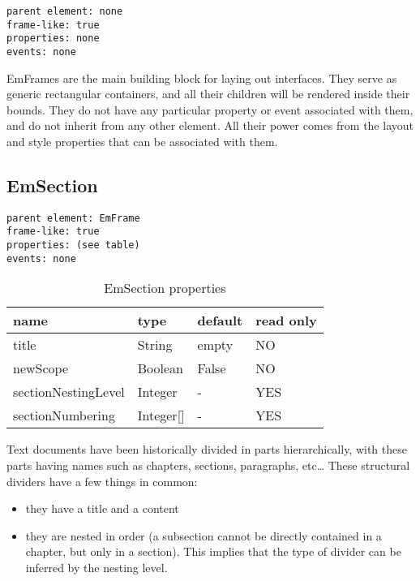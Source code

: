 \begin{verbatim}
parent element: none
frame-like: true
properties: none
events: none
\end{verbatim}

EmFrames are the main building block for laying out interfaces. They serve as generic rectangular containers, and all their children will be rendered inside their bounds. They do not have any particular property or event associated with them, and do not inherit from any other element. All their power comes from the layout and style properties that can be associated with them.

\subsection{EmSection}
\label{sec:emsection}

\begin{verbatim}
parent element: EmFrame
frame-like: true
properties: (see table)
events: none
\end{verbatim}

\begin{table}[ht]
\caption{EmSection properties}
\centering
\begin{tabular}{l l l l}
\hline\hline
name & type & default & read only \\ [0.5ex]
\hline %
title & String & empty & NO \\
newScope & Boolean & False & NO \\
sectionNestingLevel & Integer & - & YES \\
sectionNumbering & Integer[] & - & YES \\ [1ex] %
\hline %
\end{tabular}
\end{table}

Text documents have been historically divided in parts hierarchically, with these parts having names such as chapters, sections, paragraphs, etc\ldots
These structural dividers have a few things in common:
\begin{itemize}
    \item they have a title and a content
    \item they are nested in order (a subsection cannot be directly contained in a chapter, but only in a section). This implies that the type of divider can be inferred by the nesting level.
\end{itemize}

